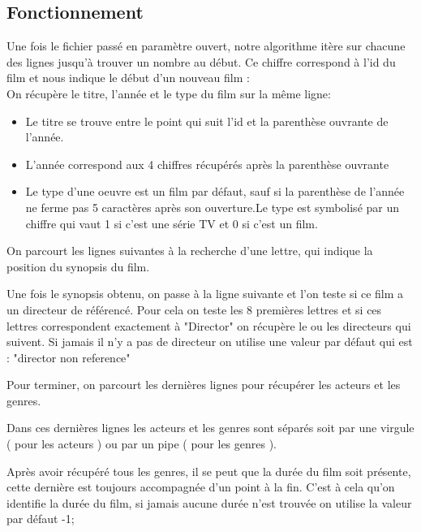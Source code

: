 \documentclass{article}
\begin{document}
\subsection{Fonctionnement}
    Une fois le fichier passé en paramètre ouvert, notre algorithme itère sur chacune des lignes jusqu'à  trouver un nombre au début. Ce chiffre correspond à l'id du film et nous indique le début d'un nouveau film :\\
    On récupère le titre, l'année et le type du film sur la même ligne:
    \begin{itemize}
        \item Le titre se trouve entre le point qui suit l'id et la parenthèse ouvrante de l'année.
        \item L'année correspond aux 4 chiffres récupérés après la parenthèse ouvrante
        \item Le type d'une oeuvre est un film par défaut, sauf si la parenthèse de l'année ne ferme pas 5 caractères après son ouverture.Le type est symbolisé par un chiffre qui vaut 1 si c'est une série TV et 0 si c'est un film.
    \end{itemize}
    \par On parcourt les lignes suivantes à la recherche d'une lettre, qui indique la position du synopsis du film.
    \\
    \par Une fois le synopsis obtenu, on passe à la ligne suivante et l'on teste si ce film a un directeur de référencé. Pour cela on teste les 8 premières lettres et si ces lettres correspondent exactement à "Director" on récupère le ou les directeurs qui suivent. Si jamais il n'y a pas de directeur on utilise une valeur par défaut qui est : "director non reference"\\ 
    \par Pour terminer, on parcourt les dernières lignes pour récupérer les acteurs et les genres.
    \par Dans ces dernières lignes les acteurs et les genres sont séparés soit par une virgule ( pour les acteurs ) ou par un pipe ( pour les genres ).
    \par Après avoir récupéré tous les genres, il se peut que la durée du film soit présente, cette dernière est toujours accompagnée d'un point à la fin. C'est à cela qu'on identifie la durée du film, si jamais aucune durée n'est trouvée on utilise la valeur par défaut -1;\\
    
\end{document}
